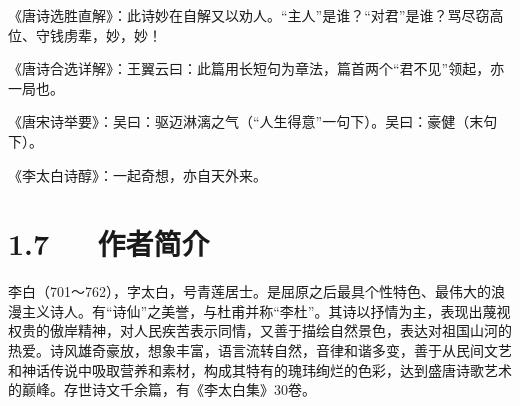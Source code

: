 \documentclass[letterpaper,10pt,english]{sphinxmanual}
\begin{document}
《唐诗选胜直解》：此诗妙在自解又以劝人。“主人”是谁？“对君”是谁？骂尽窃高位、守钱虏辈，妙，妙！

《唐诗合选详解》：王翼云曰：此篇用长短句为章法，篇首两个“君不见”领起，亦一局也。

《唐宋诗举要》：吴曰：驱迈淋漓之气（“人生得意”一句下）。吴曰：豪健（末句下）。

《李太白诗醇》：一起奇想，亦自天外来。


\section{1.7   作者简介}
\label{\detokenize{p01_u6563_u6587/_u674e_u767d-_u5c06_u8fdb_u9152:id9}}
李白（701～762），字太白，号青莲居士。是屈原之后最具个性特色、最伟大的浪漫主义诗人。有“诗仙”之美誉，与杜甫并称“李杜”。其诗以抒情为主，表现出蔑视权贵的傲岸精神，对人民疾苦表示同情，又善于描绘自然景色，表达对祖国山河的热爱。诗风雄奇豪放，想象丰富，语言流转自然，音律和谐多变，善于从民间文艺和神话传说中吸取营养和素材，构成其特有的瑰玮绚烂的色彩，达到盛唐诗歌艺术的巅峰。存世诗文千余篇，有《李太白集》30卷。
\end{document}
